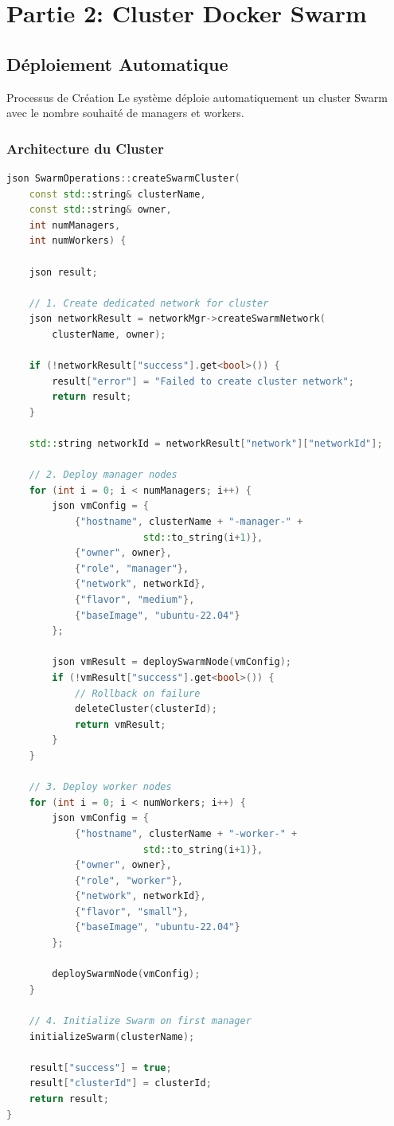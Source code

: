 \documentclass[12pt,a4paper]{article}
\begin{document}
\section{Partie 2: Cluster Docker Swarm}

\subsection{Déploiement Automatique}

\begin{infobox}{Processus de Création}
Le système déploie automatiquement un cluster Swarm avec le nombre souhaité de managers et workers.
\end{infobox}

\subsubsection{Architecture du Cluster}

\begin{lstlisting}[language=C++, caption=Création de cluster]
json SwarmOperations::createSwarmCluster(
    const std::string& clusterName,
    const std::string& owner,
    int numManagers,
    int numWorkers) {
    
    json result;
    
    // 1. Create dedicated network for cluster
    json networkResult = networkMgr->createSwarmNetwork(
        clusterName, owner);
    
    if (!networkResult["success"].get<bool>()) {
        result["error"] = "Failed to create cluster network";
        return result;
    }
    
    std::string networkId = networkResult["network"]["networkId"];
    
    // 2. Deploy manager nodes
    for (int i = 0; i < numManagers; i++) {
        json vmConfig = {
            {"hostname", clusterName + "-manager-" + 
                        std::to_string(i+1)},
            {"owner", owner},
            {"role", "manager"},
            {"network", networkId},
            {"flavor", "medium"},
            {"baseImage", "ubuntu-22.04"}
        };
        
        json vmResult = deploySwarmNode(vmConfig);
        if (!vmResult["success"].get<bool>()) {
            // Rollback on failure
            deleteCluster(clusterId);
            return vmResult;
        }
    }
    
    // 3. Deploy worker nodes
    for (int i = 0; i < numWorkers; i++) {
        json vmConfig = {
            {"hostname", clusterName + "-worker-" + 
                        std::to_string(i+1)},
            {"owner", owner},
            {"role", "worker"},
            {"network", networkId},
            {"flavor", "small"},
            {"baseImage", "ubuntu-22.04"}
        };
        
        deploySwarmNode(vmConfig);
    }
    
    // 4. Initialize Swarm on first manager
    initializeSwarm(clusterName);
    
    result["success"] = true;
    result["clusterId"] = clusterId;
    return result;
}
\end{lstlisting}
\end{document}
